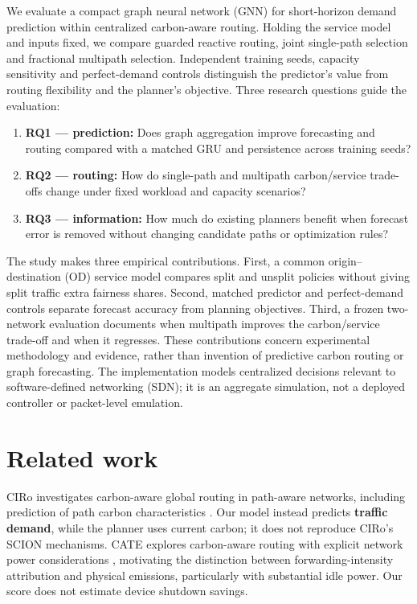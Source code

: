 \documentclass[conference,letterpaper]{IEEEtran}
\begin{document}
We evaluate a compact graph neural network (GNN) for short-horizon demand prediction within centralized carbon-aware routing. Holding the service model and inputs fixed, we compare guarded reactive routing, joint single-path selection and fractional multipath selection. Independent training seeds, capacity sensitivity and perfect-demand controls distinguish the predictor's value from routing flexibility and the planner's objective. Three research questions guide the evaluation:

\begin{enumerate}
\item \textbf{RQ1 --- prediction:} Does graph aggregation improve forecasting and routing compared with a matched GRU and persistence across training seeds?

\item \textbf{RQ2 --- routing:} How do single-path and multipath carbon/service trade-offs change under fixed workload and capacity scenarios?

\item \textbf{RQ3 --- information:} How much do existing planners benefit when forecast error is removed without changing candidate paths or optimization rules?

\end{enumerate}
The study makes three empirical contributions. First, a common origin--destination (OD) service model compares split and unsplit policies without giving split traffic extra fairness shares. Second, matched predictor and perfect-demand controls separate forecast accuracy from planning objectives. Third, a frozen two-network evaluation documents when multipath improves the carbon/service trade-off and when it regresses. These contributions concern experimental methodology and evidence, rather than invention of predictive carbon routing or graph forecasting. The implementation models centralized decisions relevant to software-defined networking (SDN); it is an aggregate simulation, not a deployed controller or packet-level emulation.

\section{Related work}

CIRo investigates carbon-aware global routing in path-aware networks, including prediction of path carbon characteristics \cite{ciro2023}. Our model instead predicts \textbf{traffic demand}, while the planner uses current carbon; it does not reproduce CIRo's SCION mechanisms. CATE explores carbon-aware routing with explicit network power considerations \cite{cate2023}, motivating the distinction between forwarding-intensity attribution and physical emissions, particularly with substantial idle power. Our score does not estimate device shutdown savings.
\end{document}
